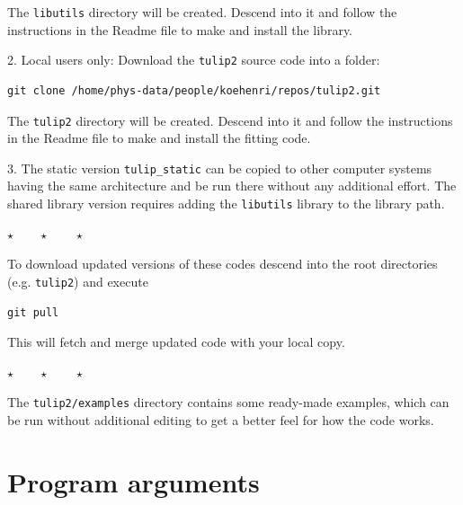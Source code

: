 \documentclass[a4paper,12pt,pdftex,onecolumn]{article}
\newcommand{\stars}{\begin{center}%
\vspace{1em plus 0.5em minus 0.5em}%
$\star \qquad \star \qquad \star$%
\vspace{1em plus 0.5em minus 0.5em}%
\end{center}}
\begin{document}
The \verb+libutils+ directory will be created. Descend into it and
follow the instructions in the Readme file to make and install the
library.

2. Local users only: Download the \verb+tulip2+ source code into a folder:

\begin{Verbatim}[fontsize=\relsize{-1},frame=single]
git clone /home/phys-data/people/koehenri/repos/tulip2.git
\end{Verbatim}

The \verb+tulip2+ directory will be created. Descend into it and
follow the instructions in the Readme file to make and install the
fitting code.

3. The static version \verb+tulip_static+ can be copied to other
computer systems having the same architecture and be run there
without any additional effort. The shared library version requires
adding the \verb+libutils+ library to the library path.

\stars

To download updated versions of these codes descend into the root
directories (e.g. \verb+tulip2+) and execute

\begin{Verbatim}[fontsize=\relsize{-1},frame=single]
git pull
\end{Verbatim}

This will fetch and merge updated code with your local copy.

\stars

The \verb+tulip2/examples+ directory contains some ready-made examples,
which can be run without additional editing to get a better feel
for how the code works.




\section{Program arguments}
\end{document}
